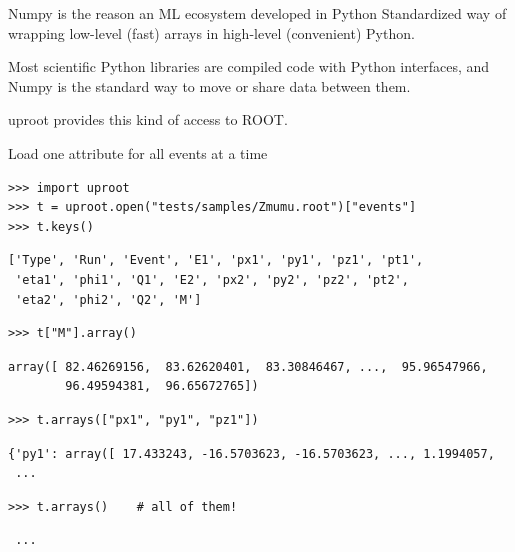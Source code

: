 \documentclass[aspectratio=169]{beamer}
\begin{document}
\begin{frame}{Numpy is the reason an ML ecosystem developed in Python}
\vspace{0.5 cm}
Standardized way of wrapping low-level (fast) arrays in high-level (convenient) Python.

\vspace{0.5 cm}
Most scientific Python libraries are compiled code with Python interfaces, and Numpy is the standard way to move or share data between them.

\vspace{0.5 cm}
uproot provides this kind of access to ROOT.
\end{frame}

\begin{frame}[fragile]{Load one attribute for all events at a time}
\vspace{0.1 cm}
\small
\begin{verbatim}
>>> import uproot
>>> t = uproot.open("tests/samples/Zmumu.root")["events"]
>>> t.keys()
\end{verbatim}
\begin{verbatim}
['Type', 'Run', 'Event', 'E1', 'px1', 'py1', 'pz1', 'pt1',
 'eta1', 'phi1', 'Q1', 'E2', 'px2', 'py2', 'pz2', 'pt2',
 'eta2', 'phi2', 'Q2', 'M']
\end{verbatim}
\begin{verbatim}
>>> t["M"].array()
\end{verbatim}
\begin{verbatim}
array([ 82.46269156,  83.62620401,  83.30846467, ...,  95.96547966,
        96.49594381,  96.65672765])
\end{verbatim}
\begin{verbatim}
>>> t.arrays(["px1", "py1", "pz1"])
\end{verbatim}
\begin{verbatim}
{'py1': array([ 17.433243, -16.5703623, -16.5703623, ..., 1.1994057,
 ...
\end{verbatim}
\begin{verbatim}
>>> t.arrays()    # all of them!
\end{verbatim}
\begin{verbatim}
 ...
\end{verbatim}
\end{frame}
\end{document}
